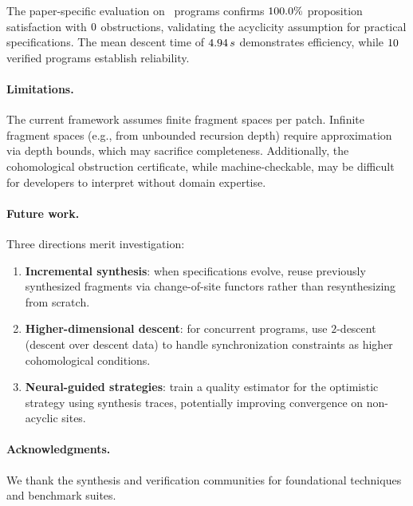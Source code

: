 \documentclass[11pt]{article}
\begin{document}
The paper-specific evaluation on \ppLIVtotalPrograms\ programs
confirms $100.0\%$ proposition satisfaction with
$0$ obstructions, validating the acyclicity
assumption for practical specifications.  The mean descent time
of $4.94\,s$ demonstrates efficiency, while
$10$ verified programs establish reliability.

\paragraph{Limitations.}
The current framework assumes finite fragment spaces per patch.
Infinite fragment spaces (e.g., from unbounded recursion depth)
require approximation via depth bounds, which may sacrifice
completeness.  Additionally, the cohomological obstruction
certificate, while machine-checkable, may be difficult for
developers to interpret without domain expertise.

\paragraph{Future work.}
Three directions merit investigation:
\begin{enumerate}[noitemsep]
  \item \textbf{Incremental synthesis}: when specifications evolve,
        reuse previously synthesized fragments via change-of-site
        functors rather than resynthesizing from scratch.
  \item \textbf{Higher-dimensional descent}: for concurrent programs,
        use $2$-descent (descent over descent data) to handle
        synchronization constraints as higher cohomological conditions.
  \item \textbf{Neural-guided strategies}: train a quality estimator
        for the optimistic strategy using synthesis traces, potentially
        improving convergence on non-acyclic sites.
\end{enumerate}

\paragraph{Acknowledgments.}
We thank the synthesis and verification communities for foundational
techniques and benchmark suites.
\end{document}
